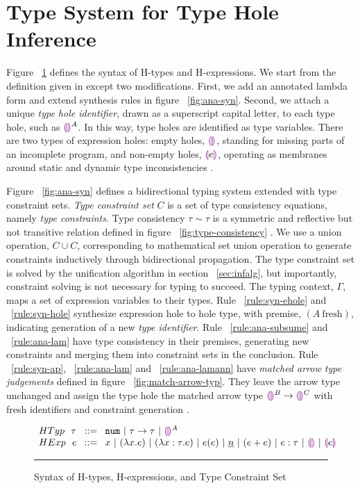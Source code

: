 \section{Type System for Type Hole Inference}
\label{sec:typinf}
Figure ~\ref{fig:syntax_fig} defines the syntax of H-types and H-expressions. We start from the definition given in \citet{HazelnutPOPL} except two modifications. First, we add an annotated lambda form and extend synthesis rules in figure ~\ref{fig:ana-syn}. Second, we attach a unique \emph{type hole identifier}, drawn as a superscript capital letter, to each type hole, such as $\textcolor{violet}{\llparenthesis}\textcolor{violet}{\rrparenthesis}^A$. In this way, type holes are identified as type variables. There are two types of expression holes: empty holes, $\textcolor{violet}{\llparenthesis}\textcolor{violet}{\rrparenthesis}$, standing for missing parts of an incomplete program, and non-empty holes, $\textcolor{violet}{\llparenthesis} e \textcolor{violet}{\rrparenthesis}$, operating as membranes around static and dynamic type inconsistencies \cite{HazelLive}. \par
Figure ~\ref{fig:ana-syn} defines a bidirectional typing system extended with type constraint sets. \emph{Type constraint set} $C$ is a set of type consistency equations, namely \emph{type constraints}. Type consistency $\tau \sim \tau$ is a symmetric and reflective but not transitive relation defined in figure ~\ref{fig:type-consistency} \cite{HazelnutPOPL}. We use a union operation, $C \cup C$, corresponding to mathematical set union operation to generate constraints inductively through bidirectional propagation. The type constraint set is solved by the unification algorithm in section ~\ref{sec:infalg}, but importantly, constraint solving is not necessary for typing to succeed. The typing context, $\Gamma$, maps a set of expression variables to their types. Rule ~\ref{rule:syn-ehole} and ~\ref{rule:syn-hole} synthesize expression hole to hole type, with premise, $(A ~ \text{fresh})$, indicating generation of a new \emph{type identifier}. Rule ~\ref{rule:ana-subsume} and ~\ref{rule:ana-lam} have type consistency in their premises, generating new constraints and merging them into constraint sets in the conclusion. Rule ~\ref{rule:syn-ap}, ~\ref{rule:ana-lam} and ~\ref{rule:ana-lamann} have \emph{matched arrow type judgements} defined in figure ~\ref{fig:match-arrow-typ}. They leave the arrow type unchanged and assign the type hole the matched arrow type $\textcolor{violet}{\llparenthesis}\textcolor{violet}{\rrparenthesis}^B \rightarrow \textcolor{violet}{\llparenthesis}\textcolor{violet}{\rrparenthesis}^C$ with fresh identifiers and constraint generation \cite{HazelnutPOPL}.
\begin{figure}
$\arraycolsep=4pt\begin{array}{lll}
HTyp~~ \tau & ::= &
  \tnum ~\vert~
  \tarr{\tau}{\tau} ~\vert~
  \ehole^A
  \\
HExp~~ e & ::= &
  x ~\vert~
  \lamfunc{x}{e} ~\vert~
  \lamfunc{x:\tau}{e} ~\vert~
  e(e) ~\vert~
  \underlinenum{n} ~\vert~
  (e+e) ~\vert~
  e: \tau ~\vert~
  \ehole  ~\vert~
  \notehole{e} 
\end{array}$
\hrule
\caption{Syntax of H-types, H-expressions, and Type Constraint Set}
\label{fig:syntax_fig}
\vspace{-5px}
\end{figure}
